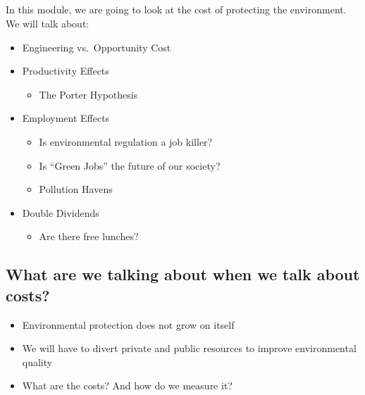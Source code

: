 \documentclass[
]{article}
\author{}
\date{\vspace{-2.5em}}
\providecommand{\tightlist}{%
  \setlength{\itemsep}{0pt}\setlength{\parskip}{0pt}}
\begin{document}
\hypertarget{section}{%
\subsection{}\label{section}}

In this module, we are going to look at the cost of protecting the
environment. We will talk about:

\begin{itemize}
\tightlist
\item
  Engineering vs.~Opportunity Cost
\item
  Productivity Effects

  \begin{itemize}
  \tightlist
  \item
    The Porter Hypothesis
  \end{itemize}
\item
  Employment Effects

  \begin{itemize}
  \tightlist
  \item
    Is environmental regulation a job killer?
  \item
    Is ``Green Jobs'' the future of our society?
  \item
    Pollution Havens
  \end{itemize}
\item
  Double Dividends

  \begin{itemize}
  \tightlist
  \item
    Are there free lunches?
  \end{itemize}
\end{itemize}

\hypertarget{what-are-we-talking-about-when-we-talk-about-costs}{%
\subsection{What are we talking about when we talk about
costs?}\label{what-are-we-talking-about-when-we-talk-about-costs}}

\begin{itemize}
\tightlist
\item
  Environmental protection does not grow on itself
\item
  We will have to divert private and public resources to improve
  environmental quality
\item
  What are the costs? And how do we measure it?
\end{itemize}
\end{document}
